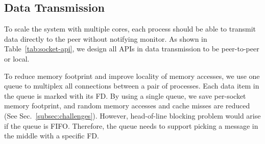 



\subsection{Data Transmission}
\label{subsec:data_trans}

To scale the system with multiple cores, each process should be able to transmit data directly to the peer without notifying monitor. As shown in Table~\ref{tab:socket-api}, we design all APIs in data transmission to be peer-to-peer or local.

To reduce memory footprint and improve locality of memory accesses, we use one queue to multiplex all connections between a pair of processes. Each data item in the queue is marked with its FD. By using a single queue, we save per-socket memory footprint, and random memory accesses and cache misses are reduced (See Sec.~\ref{subsec:challenges}). However, head-of-line blocking problem would arise if the queue is FIFO. 
Therefore, the queue needs to support picking a message in the middle with a specific FD. 

